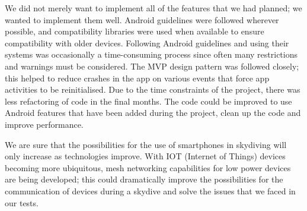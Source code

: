 We did not merely want to implement all of the features that we had planned; we wanted to implement them well. Android guidelines were followed wherever possible, and compatibility libraries were used when available to ensure compatibility with older devices. Following Android guidelines and using their systems was occasionally a time-consuming process since often many restrictions and warnings must be considered. The MVP design pattern was followed closely; this helped to reduce crashes in the app on various events that force app activities to be reinitialised. Due to the time constraints of the project, there was less refactoring of code in the final months. The code could be improved to use Android features that have been added during the project, clean up the code and improve performance.

We are sure that the possibilities for the use of smartphones in skydiving will only increase as technologies improve. With IOT (Internet of Things) devices becoming more ubiquitous, mesh networking capabilities for low power devices are being developed; this could dramatically improve the possibilities for the communication of devices during a skydive and solve the issues that we faced in our tests.
